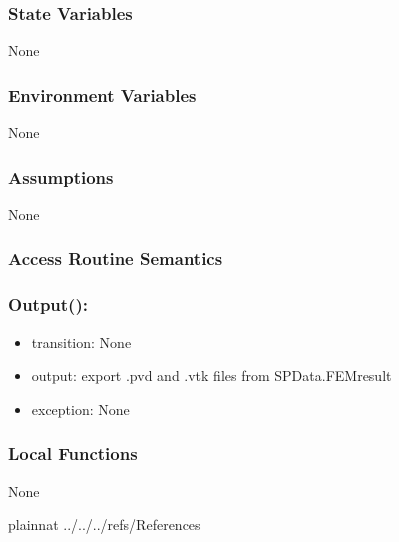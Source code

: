 \documentclass[12pt, titlepage]{article}
\begin{document}
	\subsubsection{State Variables} None
	
	\subsubsection{Environment Variables} None
	
	\subsubsection{Assumptions} None
	
	\subsubsection{Access Routine Semantics}
	
	\subsubsection*{Output():} \begin{itemize} \item transition: None \item output:
		export .pvd and .vtk files from SPData.FEMresult \item exception: None
	\end{itemize}
	
	
	\subsubsection{Local Functions} None
	
	\newpage %
	
	
	 {plainnat}  {../../../refs/References}
	
	
	
\end{document}

